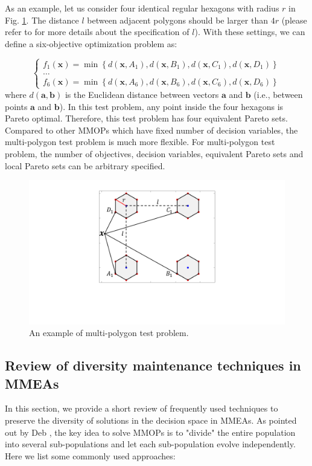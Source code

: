 \documentclass[conference]{IEEEtran}
\begin{document}
As an example, let us consider four identical regular hexagons with radius $r$ in Fig. \ref{fig:Multi-Polygon Problem}. The distance $l$ between adjacent polygons should be larger than $4r$ (please refer to \cite{ishibuchi2019salable} for more details about the specification of $l$). With these settings, we can define a six-objective optimization problem as:

\begin{equation*}
\left\{
\begin{array}{c}{f_{1}(\boldsymbol{x})=\min \left\{d\left(\boldsymbol{x}, A_{1}\right), d\left(\boldsymbol{x}, B_{1}\right), d\left(\boldsymbol{x}, C_{1}\right), d\left(\boldsymbol{x}, D_{1}\right)\right\}} \\ \dots \\ {{f_{6}}(\boldsymbol{x})=\min \left\{d\left(\boldsymbol{x}, A_{6}\right), d\left(\boldsymbol{x}, B_{6}\right), d\left(\boldsymbol{x}, C_{6}\right), d\left(\boldsymbol{x}, D_{6}\right)\right\}}\end{array}
\right.
\end{equation*}
where $d(\boldsymbol{a} ,\boldsymbol{b})$ is the Euclidean distance between vectors $\boldsymbol{a}$ and $\boldsymbol{b}$ (i.e., between points $\boldsymbol{a}$ and $\boldsymbol{b}$). In this test problem, any point inside the four hexagons is Pareto optimal. Therefore, this test problem has four equivalent Pareto sets. Compared to other MMOPs which have fixed number of decision variables, the multi-polygon test problem is much more flexible. For multi-polygon test problem, the number of objectives, decision variables, equivalent Pareto sets and local Pareto sets can be arbitrary specified\cite{ishibuchi2019salable}.

\begin{figure}[t!]
	\centering
	\includegraphics[width=.25\textwidth]{Section2/Problem}
	\caption{An example of multi-polygon test problem.}
	\label{fig:Multi-Polygon Problem}
\end{figure}

\subsection{Review of diversity maintenance techniques in MMEAs}
\label{Review of State-of-the-art Techniques}
In this section, we provide a short review of frequently used techniques to preserve the diversity of solutions in the decision space in MMEAs. As pointed out by Deb \cite{deb2001multi}, the key idea to solve MMOPs is to "divide" the entire population into several sub-populations and let each sub-population evolve independently. Here we list some commonly used approaches:
\end{document}
